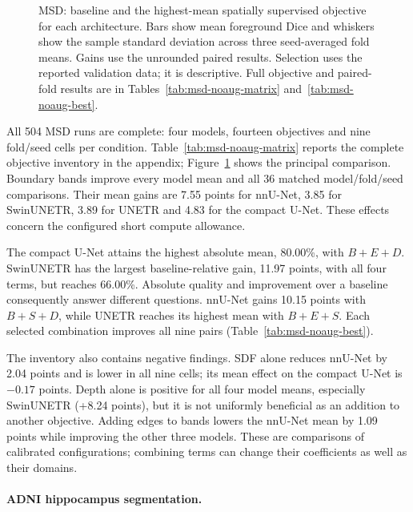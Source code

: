 \documentclass[12pt,a4paper]{article}
\begin{document}
\begin{figure}[htbp]
\caption{MSD: baseline and the highest-mean spatially supervised objective for each architecture. Bars show mean foreground Dice and whiskers show the sample standard deviation across three seed-averaged fold means. Gains use the unrounded paired results. Selection uses the reported validation data; it is descriptive. Full objective and paired-fold results are in Tables~\ref{tab:msd-noaug-matrix} and~\ref{tab:msd-noaug-best}.}
\label{fig:msd-key-results}
\end{figure}


All 504 MSD runs are complete: four models, fourteen objectives and
nine fold/seed cells per condition. Table~\ref{tab:msd-noaug-matrix}
reports the complete objective inventory in the appendix;
Figure~\ref{fig:msd-key-results} shows the principal comparison. Boundary bands improve every
model mean and all 36 matched model/fold/seed comparisons. Their mean
gains are 7.55 points for nnU-Net, 3.85 for SwinUNETR, 3.89 for UNETR
and 4.83 for the compact U-Net. These effects concern the configured
short compute allowance.


The compact U-Net attains the highest absolute mean, 80.00\%, with
$B+E+D$. SwinUNETR has the largest baseline-relative gain, 11.97
points, with all four terms, but reaches 66.00\%. Absolute quality
and improvement over a baseline consequently answer different questions.
nnU-Net gains 10.15 points with $B+S+D$, while UNETR reaches its highest
mean with $B+E+S$. Each selected combination improves all nine pairs
(Table~\ref{tab:msd-noaug-best}).

The inventory also contains negative findings. SDF alone reduces
nnU-Net by 2.04 points and is lower in all nine cells; its mean effect
on the compact U-Net is $-0.17$ points. Depth alone is positive for
all four model means, especially SwinUNETR (+8.24 points), but it is
not uniformly beneficial as an addition to another objective. Adding
edges to bands lowers the nnU-Net mean by 1.09 points while improving
the other three models. These are comparisons of calibrated configurations;
combining terms can change their coefficients as well as their domains.


\FloatBarrier
\paragraph{ADNI hippocampus segmentation.}
\label{sec:adni-results}
\end{document}
